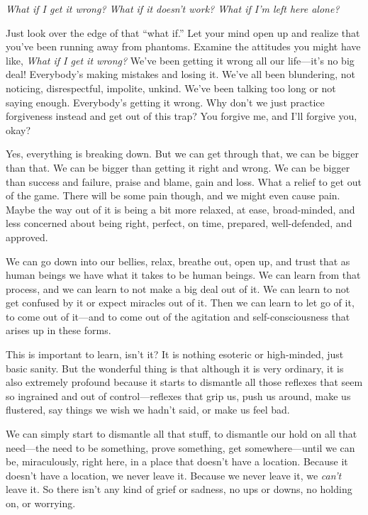 
\emph{What if I get it wrong? What if it doesn't work? What if I'm left 
here alone?}

Just look over the edge of that ``what if.'' Let your mind open up and 
realize that you've been running away from phantoms. Examine the 
attitudes you might have like, \emph{What if I get it wrong?} We've 
been getting it wrong all our life---it's no big deal! Everybody's 
making mistakes and losing it. We've all been blundering, not noticing, 
disrespectful, impolite, unkind. We've been talking too long or not 
saying enough. Everybody's getting it wrong. Why don't we just practice 
forgiveness instead and get out of this trap? You forgive me, and I'll 
forgive you, okay?

Yes, everything is breaking down. But we can get through that, we can 
be bigger than that. We can be bigger than getting it right and wrong. 
We can be bigger than success and failure, praise and blame, gain and 
loss. What a relief to get out of the game. There will be some pain 
though, and we might even cause pain. Maybe the way out of it is being 
a bit more relaxed, at ease, broad-minded, and less concerned about 
being right, perfect, on time, prepared, well-defended, and approved.

We can go down into our bellies, relax, breathe out, open up, and trust 
that as human beings we have what it takes to be human beings. We can 
learn from that process, and we can learn to not make a big deal out of 
it. We can learn to not get confused by it or expect miracles out of 
it. Then we can learn to let go of it, to come out of it---and to come 
out of the agitation and self-consciousness that arises up in these 
forms.

This is important to learn, isn't it? It is nothing esoteric or 
high-minded, just basic sanity. But the wonderful thing is that 
although it is very ordinary, it is also extremely profound because it 
starts to dismantle all those reflexes that seem so ingrained and out 
of control---reflexes that grip us, push us around, make us flustered, 
say things we wish we hadn't said, or make us feel bad.

We can simply start to dismantle all that stuff, to dismantle our hold 
on all that need---the need to be something, prove something, get 
somewhere---until we can be, miraculously, right here, in a place that 
doesn't have a location. Because it doesn't have a location, we never 
leave it. Because we never leave it, we \emph{can't} leave it. So there 
isn't any kind of grief or sadness, no ups or downs, no holding on, or 
worrying.


